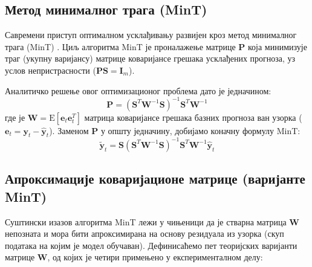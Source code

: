 \documentclass[12pt,oneside]{memoir}
\begin{document}
\subsection{Метод минималног трага (MinT)}

Савремени приступ оптималном усклађивању развијен кроз метод минималног трага (MinT) \cite{wickramasuriya2019optimal}. Циљ алгоритма MinT је проналажење матрице $\mathbf{P}$ која минимизује траг (укупну варијансу) матрице коваријансе грешака усклађених прогноза, уз услов непристрасности ($\mathbf{P S} = \mathbf{I}_m$).

Аналитичко решење овог оптимизационог проблема дато је једначином:
\begin{equation}
    \mathbf{P} = (\mathbf{S}^T \mathbf{W}^{-1} \mathbf{S})^{-1} \mathbf{S}^T \mathbf{W}^{-1}
\end{equation}
где је $\mathbf{W} = \text{E}[\mathbf{e}_t \mathbf{e}_t^T]$ матрица коваријансе грешака базних прогноза ван узорка ($\mathbf{e}_t = \mathbf{y}_t - \hat{\mathbf{y}}_t$). Заменом $\mathbf{P}$ у општу једначину, добијамо коначну формулу MinT:
\begin{equation}
    \tilde{\mathbf{y}}_t = \mathbf{S} (\mathbf{S}^T \mathbf{W}^{-1} \mathbf{S})^{-1} \mathbf{S}^T \mathbf{W}^{-1} \hat{\mathbf{y}}_t
\end{equation}

\subsection{Апроксимације коваријационе матрице (варијанте MinT)}

Суштински изазов алгоритма MinT лежи у чињеници да је стварна матрица $\mathbf{W}$ непозната и мора бити апроксимирана на основу резидуала из узорка (скуп података на којим је модел обучаван). Дефинисаћемо пет теоријских варијанти матрице $\mathbf{W}$, од којих је четири примењено у експерименталном делу:
\end{document}
